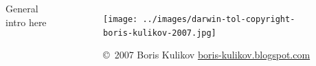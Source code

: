 \begin{frame}
    \begin{columns}[c]
        
        General intro here
        

        \begin{figure}
            \begin{center}
            \texttt{[image: ../images/darwin-tol-copyright-boris-kulikov-2007.jpg]}
            \caption{\tiny \copyright~2007 Boris Kulikov \href{http://boris-kulikov.blogspot.com/}{boris-kulikov.blogspot.com}}
            \end{center}
        \end{figure}
    \end{columns}
\end{frame}

